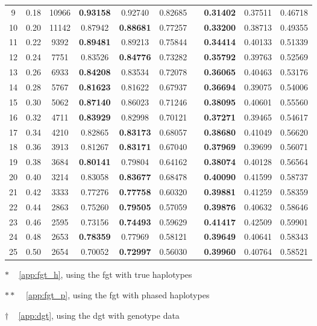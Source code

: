 \begin{table}[!htb]
\begin{threeparttable}
\begin{tabular}{
cc
S[table-format=6.1]
*3{S[table-format=1.3]}
c
*3{S[table-format=1.3]}}
9  & 0.18 & 10966  &  \bfseries 0.93158 & 0.92740 & 0.82685  & &  \bfseries 0.31402 & 0.37511 & 0.46718 \\
10 & 0.20 & 11142  &  0.87942 & \bfseries 0.88681 & 0.77257  & &  \bfseries 0.33200 & 0.38713 & 0.49355 \\
11 & 0.22 &  9392  &  \bfseries 0.89481 & 0.89213 & 0.75844  & &  \bfseries 0.34414 & 0.40133 & 0.51339 \\
12 & 0.24 &  7751  &  0.83526 & \bfseries 0.84776 & 0.73282  & &  \bfseries 0.35792 & 0.39763 & 0.52569 \\
13 & 0.26 &  6933  &  \bfseries 0.84208 & 0.83534 & 0.72078  & &  \bfseries 0.36065 & 0.40463 & 0.53176 \\
14 & 0.28 &  5767  &  \bfseries 0.81623 & 0.81622 & 0.67937  & &  \bfseries 0.36694 & 0.39075 & 0.54006 \\
15 & 0.30 &  5062  &  \bfseries 0.87140 & 0.86023 & 0.71246  & &  \bfseries 0.38095 & 0.40601 & 0.55560 \\
16 & 0.32 &  4711  &  \bfseries 0.83929 & 0.82998 & 0.70121  & &  \bfseries 0.37271 & 0.39465 & 0.54617 \\
17 & 0.34 &  4210  &  0.82865 & \bfseries 0.83173 & 0.68057  & &  \bfseries 0.38680 & 0.41049 & 0.56620 \\
18 & 0.36 &  3913  &  0.81267 & \bfseries 0.83171 & 0.67040  & &  \bfseries 0.37969 & 0.39699 & 0.56071 \\
19 & 0.38 &  3684  &  \bfseries 0.80141 & 0.79804 & 0.64162  & &  \bfseries 0.38074 & 0.40128 & 0.56564 \\
20 & 0.40 &  3214  &  0.83058 & \bfseries 0.83677 & 0.68478  & &  \bfseries 0.40090 & 0.41599 & 0.58737 \\
21 & 0.42 &  3333  &  0.77276 & \bfseries 0.77758 & 0.60320  & &  \bfseries 0.39881 & 0.41259 & 0.58359 \\
22 & 0.44 &  2863  &  0.75260 & \bfseries 0.79505 & 0.57059  & &  \bfseries 0.39876 & 0.40632 & 0.58646 \\
23 & 0.46 &  2595  &  0.73156 & \bfseries 0.74493 & 0.59629  & &  \bfseries 0.41417 & 0.42509 & 0.59901 \\
24 & 0.48 &  2653  &  \bfseries 0.78359 & 0.77969 & 0.58121  & &  \bfseries 0.39649 & 0.40641 & 0.58343 \\
25 & 0.50 &  2654  &  0.70052 & \bfseries 0.72997 & 0.56030  & &  \bfseries 0.39960 & 0.40764 & 0.58521 \\
\bottomrule
\end{tabular}
\begin{tablenotes}\footnotesize
	\item[$\ast$] ~ \cref{app:fgt_h}, using the \gls{fgt} with true haplotypes
	\item[$\ast\ast$] ~ \cref{app:fgt_p}, using the \gls{fgt} with phased haplotypes
	\item[$\dagger$] ~ \cref{app:dgt}, using the \gls{dgt} with genotype data
\end{tablenotes}
\end{threeparttable}
\end{table}

